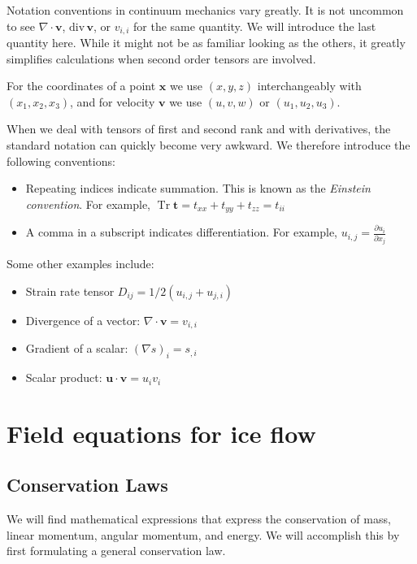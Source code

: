 \documentclass[12pt, openany]{memoir}
\newcommand{\pder}[2]{\ensuremath{\frac{\partial #1}{\partial #2}}}
\renewcommand{\div}{\text{div}\,}
\DeclareMathOperator{\Tr}{Tr}
\begin{document}
Notation conventions in continuum mechanics vary greatly. It is not
uncommon to see $\nabla \cdot \mathbf{v}$, $\div \mathbf{v}$, or
$v_{i,i}$ for the same quantity. We will introduce the last quantity
here. While it might not be as familiar looking as the others, it
greatly simplifies calculations when second order tensors are
involved.

For the coordinates of a point $\mathbf{x}$ we use
$(x,y,z)$ interchangeably with $(x_1,x_2,x_3)$, and for velocity
$\mathbf{v}$ we use $(u,v,w)$ or $(u_1,u_2,u_3)$.

When we deal with tensors of first and second rank and with
derivatives, the standard notation can quickly become very awkward. We
therefore introduce the following conventions:

\begin{itemize}
\item Repeating indices indicate summation. This is known as the
  \emph{Einstein convention}. For example, $\Tr \mathbf{t} =
  t_{xx}+t_{yy}+t_{zz} = t_{ii}$
\item A comma in a subscript indicates differentiation. For example,
  $u_{i,j} = \pder{u_i}{x_j}$
\end{itemize}

Some other examples include:

\begin{itemize}
\item Strain rate tensor $D_{ij} = 1/2(u_{i,j} + u_{j,i})$ 
\item Divergence of a vector: $\nabla \cdot \mathbf{v} = v_{i,i}$
\item Gradient of a scalar: $(\nabla s)_i = s_{,i}$
\item Scalar product: $\mathbf{u} \cdot \mathbf{v} = u_i v_i$
\end{itemize}


\chapter{Field equations for ice flow}

\section{Conservation Laws}

We will find mathematical expressions that express the conservation of
mass, linear momentum, angular momentum, and energy. We will
accomplish this by first formulating a general conservation law.
\end{document}
